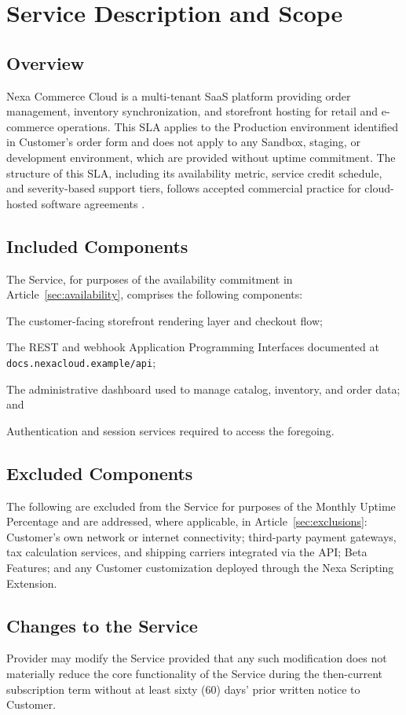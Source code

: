 \section{Service Description and Scope}
\label{sec:service-scope}

\subsection{Overview}
Nexa Commerce Cloud is a multi-tenant SaaS platform providing order management, inventory synchronization, and storefront hosting for retail and e-commerce operations. This SLA applies to the Production environment identified in Customer's order form and does not apply to any Sandbox, staging, or development environment, which are provided without uptime commitment. The structure of this SLA, including its availability metric, service credit schedule, and severity-based support tiers, follows accepted commercial practice for cloud-hosted software agreements \citep{millard2021,lawrence2019,itstandards2026}.

\subsection{Included Components}
The Service, for purposes of the availability commitment in Article~\ref{sec:availability}, comprises the following components:

\begin{slalist}
\item The customer-facing storefront rendering layer and checkout flow;
\item The REST and webhook Application Programming Interfaces documented at \texttt{docs.nexacloud.example/api};
\item The administrative dashboard used to manage catalog, inventory, and order data; and
\item Authentication and session services required to access the foregoing.
\end{slalist}

\subsection{Excluded Components}
The following are excluded from the Service for purposes of the Monthly Uptime Percentage and are addressed, where applicable, in Article~\ref{sec:exclusions}: Customer's own network or internet connectivity; third-party payment gateways, tax calculation services, and shipping carriers integrated via the API; Beta Features; and any Customer customization deployed through the Nexa Scripting Extension.

\subsection{Changes to the Service}
Provider may modify the Service provided that any such modification does not materially reduce the core functionality of the Service during the then-current subscription term without at least sixty (60) days' prior written notice to Customer.
